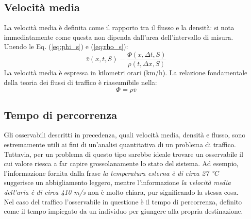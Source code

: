 \documentclass[../main.tex]{subfiles}
\begin{document}
\subsection{Velocit\`a media}
La velocit\`a media \`e definita come il rapporto tra il flusso e la densit\`a: si nota immediatamente come questa non dipenda dall'area dell'intervallo di misura.
Unendo le Eq. (\ref{eq:phi_s}) e (\ref{eq:rho_s}):
\begin{equation}
    \bar{v}(x, t, S)=\frac{\Phi(x, \Delta t, S)}{\rho(t,\Delta x, S)}
\end{equation}
La velocit\`a media \`e espressa in kilometri orari (km/h).
La relazione fondamentale della teoria dei flussi di traffico \`e riassumibile nella:
\begin{equation}
    \Phi=\rho\bar{v}
    \label{eq:fundamental}
\end{equation}

\subsection{Tempo di percorrenza}
Gli osservabili descritti in precedenza, quali velocit\`a media, densit\`a e flusso, sono estremamente utili ai fini di un'analisi quantitativa di un problema di traffico.
Tuttavia, per un problema di questo tipo sarebbe ideale trovare un osservabile il cui valore riesca a far capire grossolanamente lo stato del sistema.
Ad esempio, l'informazione fornita dalla frase \emph{la temperatura esterna \`e di circa 27 °C} suggerisce un abbigliamento leggero, mentre l'informazione \emph{la velocit\`a media dell'aria \`e di circa 410 m/s} non \`e molto chiara, pur significando la stessa cosa.
Nel caso del traffico l'osservabile in questione \`e il tempo di percorrenza, definito come il tempo impiegato da un individuo per giungere alla propria destinazione.
\end{document}
